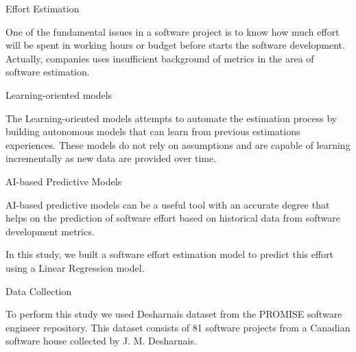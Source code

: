 \documentclass{beamer}
\begin{document}
\begin{frame}{Effort Estimation}
  \begin{block}{}
    
  
One of the fundamental issues in a software project is to know how much effort will be spent in working hours or budget before starts the software development. Actually, companies uses insufficient background of metrics in the area of software estimation.
	\end{block}
\end{frame}

\begin{frame}{Learning-oriented models}
  \begin{block}{}
The Learning-oriented models attempts to automate the estimation process by building autonomous models that can learn from previous estimations experiences. These models do not rely on assumptions and are capable of learning incrementally as new data are provided over time.
  \end{block}
\end{frame}

\begin{frame}{AI-based Predictive Models}
  \begin{block}{}
AI-based predictive models can be a useful tool with an accurate degree that helps on the prediction of software effort based on historical data from software development metrics.
	\end{block}
     \begin{block}{}
In this study, we built a software effort estimation model to predict this effort using a Linear Regression model.
  	\end{block} 
\end{frame}

\begin{frame}{Data Collection}
	\begin{block}{}
	To perform this study we used Desharnais dataset from the PROMISE software engineer repository. This dataset consists of 81 software projects from a Canadian software house collected by J. M. Desharnais.
	\end{block}
\end{frame}
\end{document}
